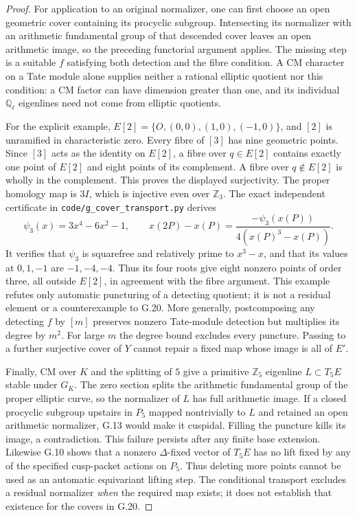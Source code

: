 \begin{proof}
For application to an original normalizer, one can first choose
an open geometric cover containing its procyclic subgroup.
Intersecting its normalizer with an arithmetic fundamental
group of that descended cover leaves an open arithmetic image,
so the preceding functorial argument applies. The missing step
is a suitable $f$ satisfying both detection and the fibre
condition. A CM character on a Tate module alone supplies neither
a rational elliptic quotient nor this condition: a CM factor
can have dimension greater than one, and its individual
$\mathbb Q_\ell$ eigenlines need not come from elliptic
quotients.

For the explicit example, $E[2]=\{O,(0,0),(1,0),(-1,0)\}$,
and $[2]$ is unramified in characteristic zero. Every fibre of
$[3]$ has nine geometric points. Since $[3]$ acts as the
identity on $E[2]$, a fibre over $q\in E[2]$ contains exactly
one point of $E[2]$ and eight points of its complement. A fibre
over $q\notin E[2]$ is wholly in the complement. This proves
the displayed surjectivity. The proper homology map is $3I$,
which is injective even over $\mathbb Z_3$.
The exact independent certificate in
\texttt{code/g\_cover\_transport.py} derives
\[
 \psi_3(x)=3x^4-6x^2-1,
 \qquad x(2P)-x(P)=\frac{-\psi_3(x(P))}{4(x(P)^3-x(P))}.
\]
It verifies that $\psi_3$ is squarefree and relatively prime
to $x^3-x$, and that its values at $0,1,-1$ are $-1,-4,-4$.
Thus its four roots give eight nonzero points of order three,
all outside $E[2]$, in agreement with the fibre argument.
This example refutes only automatic puncturing of a detecting
quotient; it is not a residual element or a counterexample to
G.20. More generally, postcomposing any detecting $f$ by $[m]$
preserves nonzero Tate-module detection but multiplies its
degree by $m^2$. For large $m$ the degree bound excludes every
puncture. Passing to a further surjective cover of $Y$ cannot
repair a fixed map whose image is all of $E'$.

Finally, CM over $K$ and the splitting of $5$ give a primitive
$\mathbb Z_5$ eigenline $L\subset T_5E$ stable under $G_K$.
The zero section splits the arithmetic fundamental group of the
proper elliptic curve, so the normalizer of $L$ has full
arithmetic image. If a closed procyclic subgroup upstairs in
$P_5$ mapped nontrivially to $L$ and retained an open arithmetic
normalizer, G.13 would make it cuspidal. Filling the puncture
kills its image, a contradiction. This failure persists after
any finite base extension. Likewise G.10 shows that a nonzero
$\Delta$-fixed vector of $T_5E$ has no lift fixed by any of
the specified cusp-packet actions on $P_5$. Thus deleting more
points cannot be used as an automatic equivariant lifting step.
The conditional transport excludes a residual normalizer
\emph{when} the required map exists; it does not establish that
existence for the covers in G.20.
\end{proof}
